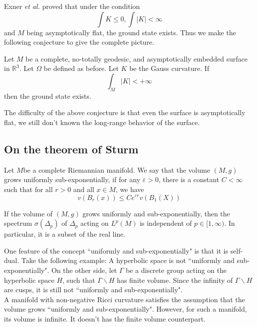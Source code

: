 \begin{remark}
Exner \textit{et al.} proved that under the condition
\[
\int K \leqslant 0, \int |K| < \infty
\]
and $M$ being asymptotically flat, the ground state exists. Thus we make the
following conjecture to give the complete picture.
\end{remark}

\begin{conjecture}
Let $M$ be a complete, no-totally geodesic, and asymptotically embedded surface
in $\mathbb{R}^3$. Let $\Omega$ be defined as before. Let $K$ be the Gauss
curvature. If
\[
\int_M |K| < +\infty
\]
then the ground state exists.
\end{conjecture}

The difficulty of the above conjecture is that even the surface is 
asymptotically flat, we still don't known the long-range behavior of the
surface.

\subsection{On the theorem of Sturm}

Let $M$be a complete Riemannian manifold. We say that the volume $(M,g)$ grows
uniformly sub-exponentially, if for any $\varepsilon > 0$, there is a constant
$C < \infty$ such that for all $r > 0$ and all $x\in M$, we have
\[
v(B_r(x))\leqslant Ce^{\varepsilon r}v(B_1(X))
\]

\begin{theorem}
[Sturm] If the volume of $(M,g)$ grows uniformly and sub-exponentially, then
the spectrum $\sigma(\Delta_p)$ of $\Delta_p$ acting on $L^p(M)$ is independent
of $p\in[1, \infty)$. In particular, it is a subset of the real line.
\end{theorem}

One feature of the concept ``uniformly and sub-exponentially" is that it is
self-dual. Take the following example: A hyperbolic space is not ``uniformly
and sub-exponentially". On the other side, let $\Gamma$ be a discrete group
acting on the hyperbolic space $H$, such that $\Gamma\backslash H$ has finite
volume. Since the infinity of $\Gamma\backslash H$ are cusps, it is still not
``uniformly and sub-exponentially".
\\

A manifold with non-negative Ricci curvature satisfies the assumption that the
volume grows ``uniformly and sub-exponentially". However, for such a manifold,
its volume is infinite. It doesn't has the finite volume counterpart.
\\

